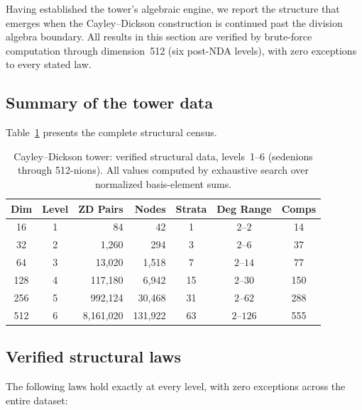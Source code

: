 \documentclass[12pt,a4paper]{article}
\theoremstyle{definition}
\theoremstyle{remark}
\begin{document}
Having established the tower's algebraic engine, we report the
structure that emerges when the Cayley--Dickson construction is
continued past the division algebra boundary. All results in this
section are verified by brute-force computation through
dimension~512 (six post-NDA levels), with zero exceptions to
every stated law.

\subsection{Summary of the tower data}

Table~\ref{tab:tower-summary} presents the complete structural
census.

\begin{table}[h]
\centering
\begin{tabular}{c|c|r|r|c|c|c}
\textbf{Dim} & \textbf{Level} & \textbf{ZD Pairs} &
  \textbf{Nodes} & \textbf{Strata} & \textbf{Deg Range} &
  \textbf{Comps} \\
\hline
16  & 1 & 84       & 42      & 1  & $2$--$2$   & 14  \\
32  & 2 & 1,260    & 294     & 3  & $2$--$6$   & 37  \\
64  & 3 & 13,020   & 1,518   & 7  & $2$--$14$  & 77  \\
128 & 4 & 117,180  & 6,942   & 15 & $2$--$30$  & 150 \\
256 & 5 & 992,124  & 30,468  & 31 & $2$--$62$  & 288 \\
512 & 6 & 8,161,020 & 131,922 & 63 & $2$--$126$ & 555 \\
\end{tabular}
\caption{Cayley--Dickson tower: verified structural data,
levels~1--6 (sedenions through 512-nions). All values computed
by exhaustive search over normalized basis-element sums.}
\label{tab:tower-summary}
\end{table}

\subsection{Verified structural laws}

The following laws hold exactly at every level, with zero
exceptions across the entire dataset:
\end{document}
